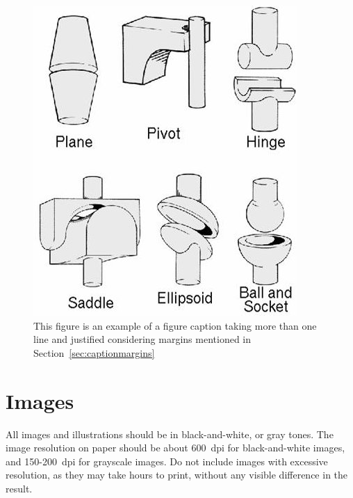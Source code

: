 \begin{figure}[h!]
	\centerline{\includegraphics{fig2}}
	\caption{This figure is an example of a figure caption taking
		more than one line and justified considering margins
		mentioned in Section~\ref{sec:captionmargins}}
	\label{figtwo}
\end{figure}

\section{Images}
All images and illustrations should be in black-and-white, or gray
tones. The image resolution on paper should be about 600~dpi for
black-and-white images, and 150-200~dpi for grayscale images.  Do not
include images with excessive resolution, as they may take hours to
print, without any visible difference in the result.

